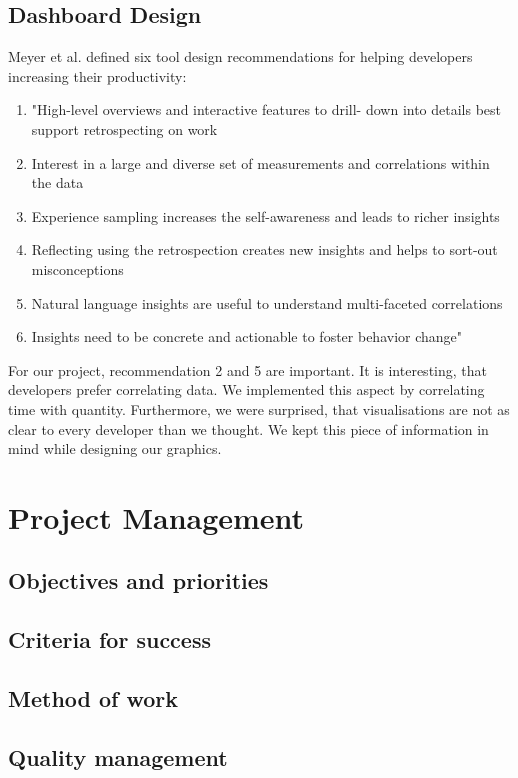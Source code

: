 \documentclass{seal_article}
\begin{document}
\subsection{Dashboard Design}

Meyer et al. \cite{Meyer:2017:DRS:3171581.3134714} defined six tool design recommendations for helping developers increasing their productivity:
\begin{enumerate}
	\item "High-level overviews and interactive features to drill- down into details best support retrospecting on work
	\item Interest in a large and diverse set of measurements and correlations within the data
	\item Experience sampling increases the self-awareness and leads to richer insights
	\item Reflecting using the retrospection creates new insights and helps to sort-out misconceptions
	\item Natural language insights are useful to understand multi-faceted correlations
	\item Insights need to be concrete and actionable to foster behavior change" \cite[p. 2]{Meyer:2017:DRS:3171581.3134714}
\end{enumerate}
For our project, recommendation 2 and 5 are important. It is interesting, that developers prefer correlating data. We implemented this aspect by correlating time with quantity. Furthermore, we were surprised, that visualisations are not as clear to every developer than we thought. We kept this piece of information in mind while designing our graphics. 

\section{Project Management}

\subsection{Objectives and priorities}
\subsection{Criteria for success}
\subsection{Method of work}
\subsection{Quality management}
\end{document}
